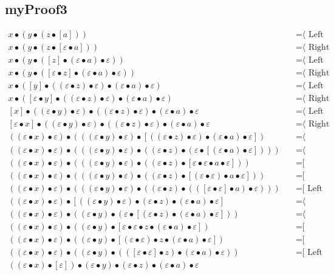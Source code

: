 \documentclass{article}
\begin{document}
\subsection{myProof3}
\begin{align*}
x • (y • (z • [a]))
  & \quad \text{=⟨ Left neutrality ]}\\
x • (y • (z • [ε • a]))
  & \quad \text{=⟨ Right neutrality ]}\\
x • (y • ([z] • (ε • a) • ε))
  & \quad \text{=⟨ Left neutrality ]}\\
x • (y • ([ε • z] • (ε • a) • ε))
  & \quad \text{=⟨ Right neutrality ]}\\
x • ([y] • ((ε • z) • ε) • (ε • a) • ε)
  & \quad \text{=⟨ Left neutrality ]}\\
x • ([ε • y] • ((ε • z) • ε) • (ε • a) • ε)
  & \quad \text{=⟨ Right neutrality ]}\\
[x] • ((ε • y) • ε) • ((ε • z) • ε) • (ε • a) • ε
  & \quad \text{=⟨ Left neutrality ]}\\
[ε • x] • ((ε • y) • ε) • ((ε • z) • ε) • (ε • a) • ε
  & \quad \text{=⟨ Right neutrality ]}\\
((ε • x) • ε) • (((ε • y) • ε) • [((ε • z) • ε) • (ε • a) • ε])
  & \quad \text{=⟨ Associativity ]}\\
((ε • x) • ε) • (((ε • y) • ε) • ((ε • z) • (ε • [(ε • a) • ε])))
  & \quad \text{=⟨ Associativity ]}\\
((ε • x) • ε) • (((ε • y) • ε) • ((ε • z) • [ε • ε • a • ε]))
  & \quad \text{=[ Associativity ⟩}\\
((ε • x) • ε) • (((ε • y) • ε) • ((ε • z) • [(ε • ε) • a • ε]))
  & \quad \text{=[ Associativity ⟩}\\
((ε • x) • ε) • (((ε • y) • ε) • ((ε • z) • (([ε • ε] • a) • ε)))
  & \quad \text{=[ Left neutrality ⟩}\\
((ε • x) • ε) • [((ε • y) • ε) • (ε • z) • (ε • a) • ε]
  & \quad \text{=⟨ Associativity ]}\\
((ε • x) • ε) • ((ε • y) • (ε • [(ε • z) • (ε • a) • ε]))
  & \quad \text{=⟨ Associativity ]}\\
((ε • x) • ε) • ((ε • y) • [ε • ε • z • (ε • a) • ε])
  & \quad \text{=[ Associativity ⟩}\\
((ε • x) • ε) • ((ε • y) • [(ε • ε) • z • (ε • a) • ε])
  & \quad \text{=[ Associativity ⟩}\\
((ε • x) • ε) • ((ε • y) • (([ε • ε] • z) • (ε • a) • ε))
  & \quad \text{=[ Left neutrality ⟩}\\
((ε • x) • [ε]) • (ε • y) • (ε • z) • (ε • a) • ε

\end{align*}
\end{document}

